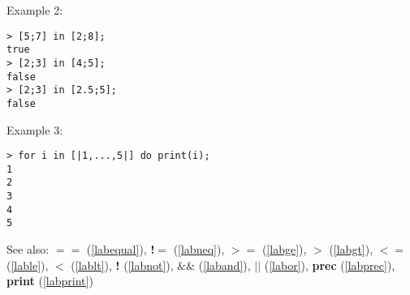 \noindent Example 2: 
\begin{center}\begin{minipage}{15cm}\begin{Verbatim}[frame=single,commandchars=\\\|\~]
> [5;7] in [2;8];
true
> [2;3] in [4;5];
false
> [2;3] in [2.5;5];
false
\end{Verbatim}
\end{minipage}\end{center}
\noindent Example 3: 
\begin{center}\begin{minipage}{15cm}\begin{Verbatim}[frame=single,commandchars=\\\|\~]
> for i in [|1,...,5|] do print(i);
1
2
3
4
5
\end{Verbatim}
\end{minipage}\end{center}
See also: \textbf{$==$} (\ref{labequal}), \textbf{!$=$} (\ref{labneq}), \textbf{$>=$} (\ref{labge}), \textbf{$>$} (\ref{labgt}), \textbf{$<=$} (\ref{lable}), \textbf{$<$} (\ref{lablt}), \textbf{!} (\ref{labnot}), \textbf{$\&\&$} (\ref{laband}), \textbf{$||$} (\ref{labor}), \textbf{prec} (\ref{labprec}), \textbf{print} (\ref{labprint})
